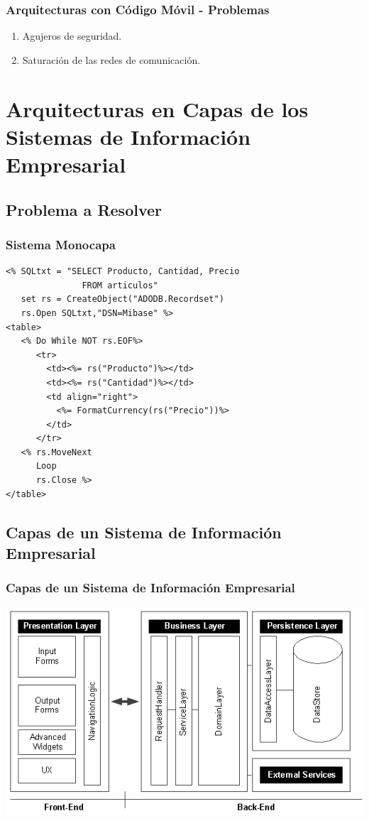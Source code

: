\documentclass[handout,a4paper,t,xcolor=pst,dvips,colortheme]{beamer}
\begin{document}
\begin{frame}[c]
    \frametitle{Arquitecturas con Código Móvil - Problemas}
    \begin{enumerate}[<+->]
        \item Agujeros de seguridad.
        \item Saturación de las redes de comunicación.
    \end{enumerate}
\end{frame}

\section[Arquitecturas en Capas de los SIE]{Arquitecturas en Capas de los Sistemas de Información Empresarial}

\subsection{Problema a Resolver}

\begin{frame}[c,fragile]
	\frametitle{Sistema Monocapa}
    \begin{lstlisting}[basicstyle=\small]
<% SQLtxt = "SELECT Producto, Cantidad, Precio
               FROM articulos"
   set rs = CreateObject("ADODB.Recordset")
   rs.Open SQLtxt,"DSN=Mibase" %>
<table>
   <% Do While NOT rs.EOF%>
      <tr>
        <td><%= rs("Producto")%></td>
        <td><%= rs("Cantidad")%></td>
        <td align="right">
          <%= FormatCurrency(rs("Precio"))%>
        </td>
      </tr>
   <% rs.MoveNext
      Loop
      rs.Close %>
</table>
    \end{lstlisting}
\end{frame}


\subsection[Capas de un SIE]{Capas de un Sistema de Información Empresarial}

\begin{frame}[c]
	\frametitle{Capas de un Sistema de Información Empresarial}
	\begin{center}
        \includegraphics[width=\linewidth,keepaspectratio=true]{images/enterpriseLayers/enterpriseLayers.eps}
	\end{center}
\end{frame}
\end{document}
